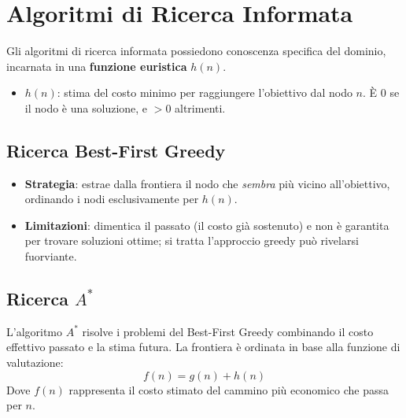 \documentclass[a4paper,11pt]{report}
\begin{document}
\section{Algoritmi di Ricerca Informata}
Gli algoritmi di ricerca informata possiedono conoscenza specifica del dominio, incarnata in una \textbf{funzione euristica} $h(n)$.
\begin{itemize}
    \item $h(n)$: stima del costo minimo per raggiungere l'obiettivo dal nodo $n$. È $0$ se il nodo è una soluzione, e $> 0$ altrimenti.
\end{itemize}

\subsection{Ricerca Best-First Greedy}
\begin{itemize}
    \item \textbf{Strategia}: estrae dalla frontiera il nodo che \textit{sembra} più vicino all'obiettivo, ordinando i nodi esclusivamente per $h(n)$.
    \item \textbf{Limitazioni}: dimentica il passato (il costo già sostenuto) e non è garantita per trovare soluzioni ottime; si tratta l'approccio greedy può rivelarsi fuorviante.
\end{itemize}

\subsection{Ricerca $A^*$}
L'algoritmo $A^*$ risolve i problemi del Best-First Greedy combinando il costo effettivo passato e la stima futura. La frontiera è ordinata in base alla funzione di valutazione:
$$f(n) = g(n) + h(n)$$ 
Dove $f(n)$ rappresenta il costo stimato del cammino più economico che passa per $n$.
\end{document}

